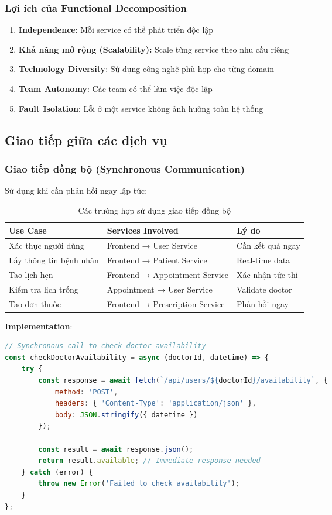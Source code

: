 \documentclass[12pt,a4paper]{report}
\begin{document}
\subsubsection{Lợi ích của Functional Decomposition}
\begin{enumerate}
    \item \textbf{Independence}: Mỗi service có thể phát triển độc lập
    \item \textbf{Khả năng mở rộng (Scalability):} Scale từng service theo nhu cầu riêng
    \item \textbf{Technology Diversity}: Sử dụng công nghệ phù hợp cho từng domain
    \item \textbf{Team Autonomy}: Các team có thể làm việc độc lập
    \item \textbf{Fault Isolation}: Lỗi ở một service không ảnh hưởng toàn hệ thống
\end{enumerate}

\subsection{Giao tiếp giữa các dịch vụ}

\subsubsection{Giao tiếp đồng bộ (Synchronous Communication)}
Sử dụng khi cần phản hồi ngay lập tức:

\begin{table}[h]
\centering
\caption{Các trường hợp sử dụng giao tiếp đồng bộ}
\begin{tabular}{|l|l|l|}
\hline
\textbf{Use Case} & \textbf{Services Involved} & \textbf{Lý do} \\
\hline
Xác thực người dùng & Frontend → User Service & Cần kết quả ngay \\
\hline
Lấy thông tin bệnh nhân & Frontend → Patient Service & Real-time data \\
\hline
Tạo lịch hẹn & Frontend → Appointment Service & Xác nhận tức thì \\
\hline
Kiểm tra lịch trống & Appointment → User Service & Validate doctor \\
\hline
Tạo đơn thuốc & Frontend → Prescription Service & Phản hồi ngay \\
\hline
\end{tabular}
\end{table}

\textbf{Implementation}:
\begin{lstlisting}[language=JavaScript, caption=HTTP REST API call example]
// Synchronous call to check doctor availability
const checkDoctorAvailability = async (doctorId, datetime) => {
    try {
        const response = await fetch(`/api/users/${doctorId}/availability`, {
            method: 'POST',
            headers: { 'Content-Type': 'application/json' },
            body: JSON.stringify({ datetime })
        });
        
        const result = await response.json();
        return result.available; // Immediate response needed
    } catch (error) {
        throw new Error('Failed to check availability');
    }
};
\end{lstlisting}
\end{document}

